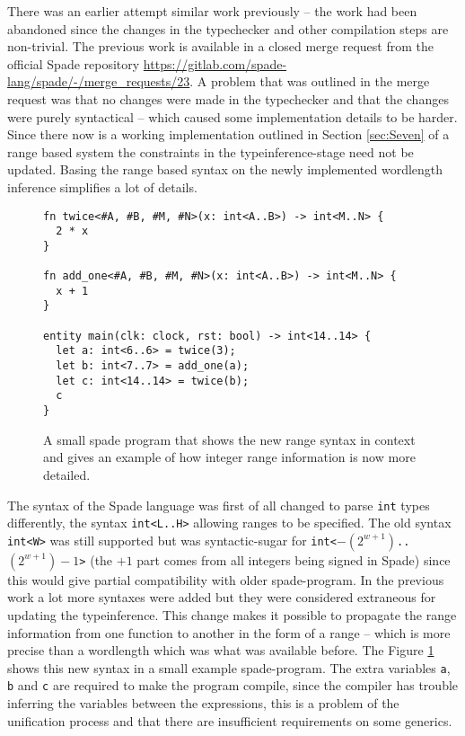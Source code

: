There was an earlier attempt similar work previously -- the work had been abandoned since the changes in the typechecker and other compilation steps are non-trivial. The previous work is available in a closed merge request from the official Spade repository \url{https://gitlab.com/spade-lang/spade/-/merge_requests/23}. A problem that was outlined in the merge request was that no changes were made in the typechecker and that the changes were purely syntactical -- which caused some implementation details to be harder. Since there now is a working implementation outlined in Section \ref{sec:Seven} of a range based system the constraints in the typeinference-stage need not be updated. Basing the range based syntax on the newly implemented wordlength inference simplifies a lot of details.

\begin{figure}
  \begin{verbatim}
fn twice<#A, #B, #M, #N>(x: int<A..B>) -> int<M..N> {
  2 * x
}

fn add_one<#A, #B, #M, #N>(x: int<A..B>) -> int<M..N> {
  x + 1
}

entity main(clk: clock, rst: bool) -> int<14..14> {
  let a: int<6..6> = twice(3);
  let b: int<7..7> = add_one(a);
  let c: int<14..14> = twice(b);
  c
}
  \end{verbatim}
  \caption{A small spade program that shows the new range syntax in context and gives an example of how integer range information is now more detailed.}
  \label{fig:BetterProgram}
\end{figure}

The syntax of the Spade language was first of all changed to parse \verb+int+ types differently, the syntax \verb+int<L..H>+ allowing ranges to be specified. The old syntax \verb+int<W>+ was still supported but was syntactic-sugar for \verb!int<!$-(2^{w+1})$\verb!..!$(2^{w+1})-1$\verb!>! (the $+1$ part comes from all integers being signed in Spade) since this would give partial compatibility with older spade-program. In the previous work a lot more syntaxes were added but they were considered extraneous for updating the typeinference. This change makes it possible to propagate the range information from one function to another in the form of a range -- which is more precise than a wordlength which was what was available before. The Figure \ref{fig:BetterProgram} shows this new syntax in a small example spade-program. The extra variables \verb+a+, \verb+b+ and \verb+c+ are required to make the program compile, since the compiler has trouble inferring the variables between the expressions, this is a problem of the unification process and that there are insufficient requirements on some generics.

